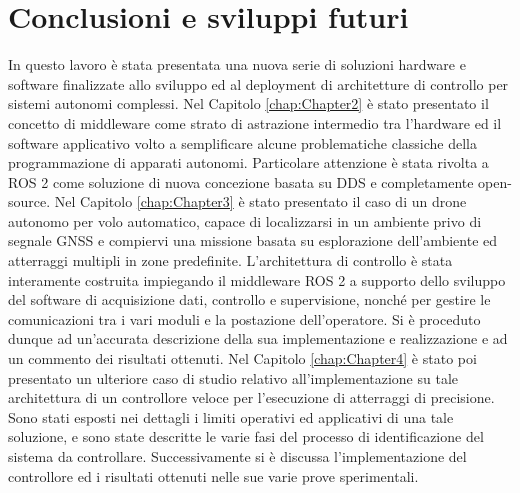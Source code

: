 \chapter[Conclusioni e sviluppi futuri]{Conclusioni e sviluppi futuri}
\label{chap:Chapter5} 
\doublespacing
\fontsize{12}{12}\selectfont
\indent In questo lavoro è stata presentata una nuova serie di soluzioni hardware e software finalizzate allo sviluppo ed al deployment di architetture di controllo per sistemi autonomi complessi. Nel Capitolo \ref{chap:Chapter2} è stato presentato il concetto di middleware come strato di astrazione intermedio tra l'hardware ed il software applicativo volto a semplificare alcune problematiche classiche della programmazione di apparati autonomi. Particolare attenzione è stata rivolta a ROS 2 come soluzione di nuova concezione basata su DDS e completamente open-source. Nel Capitolo \ref{chap:Chapter3} è stato presentato il caso di un drone autonomo per volo automatico, capace di localizzarsi in un ambiente privo di segnale GNSS e compiervi una missione basata su esplorazione dell'ambiente ed atterraggi multipli in zone predefinite. L'architettura di controllo è stata interamente costruita impiegando il middleware ROS 2 a supporto dello sviluppo del software di acquisizione dati, controllo e supervisione, nonché per gestire le comunicazioni tra i vari moduli e la postazione dell'operatore. Si è proceduto dunque ad un'accurata descrizione della sua implementazione e realizzazione e ad un commento dei risultati ottenuti. Nel Capitolo \ref{chap:Chapter4} è stato poi presentato un ulteriore caso di studio relativo all'implementazione su tale architettura di un controllore veloce per l'esecuzione di atterraggi di precisione. Sono stati esposti nei dettagli i limiti operativi ed applicativi di una tale soluzione, e sono state descritte le varie fasi del processo di identificazione del sistema da controllare. Successivamente si è discussa l'implementazione del controllore ed i risultati ottenuti nelle sue varie prove sperimentali.

